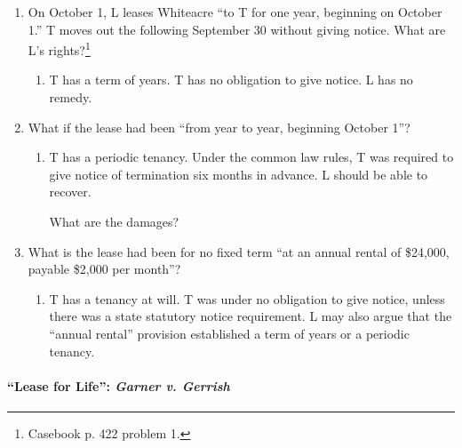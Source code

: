 \begin{enumerate}
    \item On October 1, L leases Whiteacre ``to T for one year, beginning on 
    October 1.'' T moves out the following September 30 without giving notice. 
    What are L's rights?\footnote{Casebook p. 422 problem 1.}
    \begin{enumerate}
        \item T has a term of years. T has no obligation to give notice. L has 
        no remedy.
    \end{enumerate}
    \item What if the lease had been ``from year to year, beginning October 1''?
    \begin{enumerate}
        \item T has a periodic tenancy. Under the common law rules, T was 
        required to give notice of termination six months in advance. L should 
        be able to recover.
        \item [What are the damages?] %
    \end{enumerate}
    \item What is the lease had been for no fixed term ``at an annual rental 
    of \$24,000, payable \$2,000 per month''?
    \begin{enumerate}
        \item T has a tenancy at will. T was under no obligation to give 
        notice, unless there was a state statutory notice requirement. L may 
        also argue that the ``annual rental'' provision established a term of 
        years or a periodic tenancy.
    \end{enumerate}
\end{enumerate}

\paragraph{``Lease for Life'': \emph{Garner v. Gerrish}}

